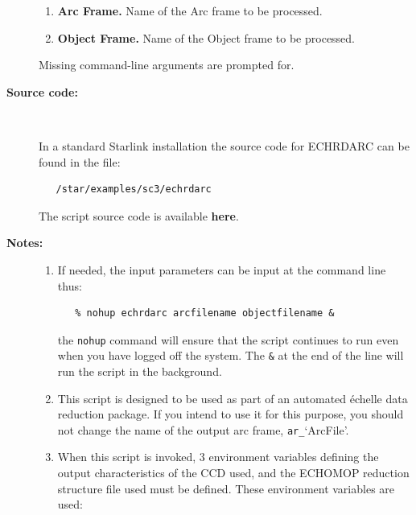 \documentclass[twoside,11pt]{article}
\newcommand{\htmlref}[2]{#1}
\begin{document}
\begin{description}
\begin{enumerate}

\item {\bf Arc Frame.}
      Name of the Arc frame to be processed.

\item {\bf Object Frame.}
      Name of the Object frame to be processed.

\end{enumerate}

     Missing command-line arguments are prompted for.

\item [{\bf Source code:}] \mbox{} \\
\begin{latex}
In a standard Starlink installation the source code for ECHRDARC can be found
in the file:
\begin{verbatim}
   /star/examples/sc3/echrdarc
\end{verbatim}
\end{latex}
\begin{htmlonly}
      The script source code is available
      \htmlref{{\bf here}}{se_echrdarc_source}.
\end{htmlonly}

\item [{\bf Notes:}] \mbox{}
\begin{enumerate}

\item If needed, the input parameters can be input at the command
      line thus:

\begin{verbatim}
   % nohup echrdarc arcfilename objectfilename &
\end{verbatim}

      the \verb+nohup+ command will ensure that the script continues
      to run even when you have logged off the system.  The \verb+&+ at
      the end of the line will run the script in the background.

\item This script is designed to be used as part of an automated
      \'{e}chelle data reduction package.  If you intend to use it
      for this purpose, you should not change the name of the output
      arc frame, \verb+ar_+`ArcFile'.

\item When this script is invoked, 3 environment variables defining
      the output characteristics of the CCD used, and the ECHOMOP
      reduction structure file used must be defined.
      These environment variables are used:


\end{enumerate}
\end{description}
\end{document}
